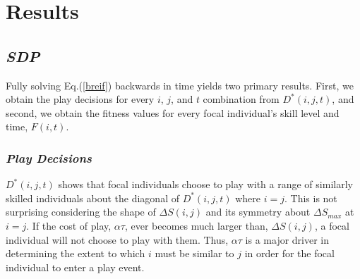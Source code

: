 \documentclass[12pt, letterpaper, fleqn]{article}
\begin{document}
    
    


\section*{Results}
  \subsection*{\it SDP}
    Fully solving Eq.(\ref{breif}) backwards in time yields two primary results.
    First, we obtain the play decisions for every $i$, $j$, and $t$ combination from $D^*(i,j,t)$, and second, we obtain the fitness values for every focal individual's skill level and time, $F(i,t)$. 
    
    \subsubsection*{\it Play Decisions}
      $D^*(i,j,t)$ shows that focal individuals choose to play with a range of similarly skilled individuals about the diagonal of $D^*(i,j,t)$ where $i=j$.
      This is not surprising considering the shape of $\Delta S(i,j)$ and its symmetry about $\Delta S_{max}$ at $i=j$.
      If the cost of play, $\alpha \tau$, ever becomes much larger than, $\Delta S(i,j)$, a focal individual will not choose to play with them.
      Thus, $\alpha \tau$ is a major driver in determining the extent to which $i$ must be similar to $j$ in order for the focal individual to enter a play event. 
     
\end{document}
